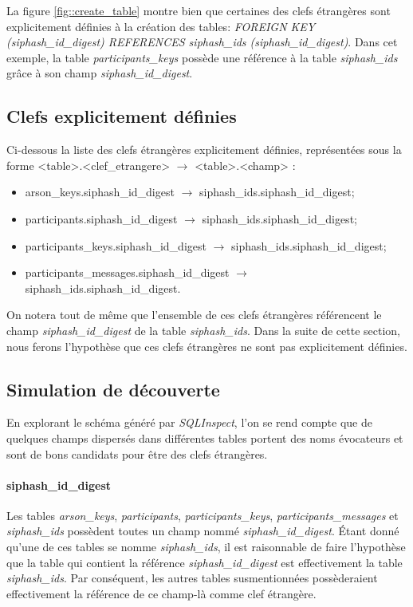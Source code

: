 \documentclass[french]{report}
\begin{document}
	La figure \ref{fig::create_table} montre bien que certaines des clefs étrangères sont explicitement définies à la création des tables: \textit{FOREIGN KEY (siphash\_id\_digest) REFERENCES siphash\_ids (siphash\_id\_digest)}. Dans cet exemple, la table \textit{participants\_keys} possède une référence à la table \textit{siphash\_ids} grâce à son champ \textit{siphash\_id\_digest}. 
	
	\subsection{Clefs explicitement définies}
	
	Ci-dessous la liste des clefs étrangères explicitement définies, représentées sous la forme \newline <table>.<clef\_etrangere> $\rightarrow$ <table>.<champ> :
	
	\begin{itemize}
		\item arson\_keys.siphash\_id\_digest $\rightarrow$ siphash\_ids.siphash\_id\_digest;
		\item participants.siphash\_id\_digest $\rightarrow$ siphash\_ids.siphash\_id\_digest;
		\item participants\_keys.siphash\_id\_digest $\rightarrow$ siphash\_ids.siphash\_id\_digest;
		\item participants\_messages.siphash\_id\_digest $\rightarrow$ siphash\_ids.siphash\_id\_digest.
	\end{itemize}

	On notera tout de même que l'ensemble de ces clefs étrangères référencent le champ \textit{siphash\_id\_digest} de la table \textit{siphash\_ids}. Dans la suite de cette section, nous ferons l'hypothèse que ces clefs étrangères ne sont pas explicitement définies.
	
	\subsection{Simulation de découverte}
	
	En explorant le schéma généré par \textit{SQLInspect}, l'on se rend compte que de quelques champs dispersés dans différentes tables portent des noms évocateurs et sont de bons candidats pour être des clefs étrangères. 
	
	\paragraph{siphash\_id\_digest}{Les tables \textit{arson\_keys}, \textit{participants}, \textit{participants\_keys}, \newline \textit{participants\_messages} et \textit{siphash\_ids}} possèdent toutes un champ nommé \textit{siphash\_id\_digest}. Étant donné qu'une de ces tables se nomme \textit{siphash\_ids}, il est raisonnable de faire l'hypothèse que la table qui contient la référence \textit{siphash\_id\_digest} est effectivement la table \textit{siphash\_ids}. Par conséquent, les autres tables susmentionnées possèderaient effectivement la référence de ce champ-là comme clef étrangère.
\end{document}

